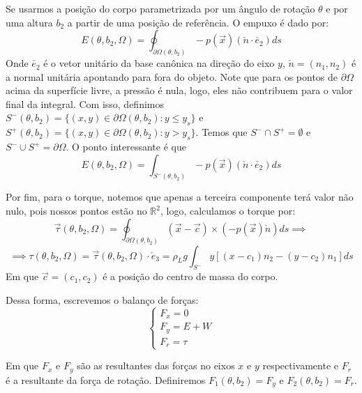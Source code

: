 \documentclass[
	12pt,				%
	oneside,			%
	a4paper,			%
	]{article}
\begin{document}
    Se usarmos a posição do corpo parametrizada por um ângulo de rotação $\theta$ e por uma altura $b_2$ a partir de uma posição de referência. O empuxo é dado por:
    \[
        E(\theta, b_2, \Omega) = \oint_{\partial \Omega (\theta, b_2)} -p(\vec{x})(\check{n} \cdot \check{e_2}) ds
    \]
    Onde $\check{e_2}$ é o vetor unitário da base canônica na direção do eixo $y$, $\check{n} = (n_1, n_2)$ é a normal unitária apontando para fora do objeto. Note que para os pontos de $\partial \Omega$ acima da superfície livre, a pressão é nula, logo, eles não contribuem para o valor final da integral. Com isso, definimos $S^-(\theta, b_2) = \{(x,y) \in \partial \Omega (\theta, b_2) : y \le y_s\}$ e $S^+(\theta, b_2) = \{(x,y) \in \partial \Omega (\theta, b_2) : y > y_s \}$. Temos que $S^- \cap S^+ = \emptyset$ e $S^- \cup S^+ = \partial \Omega$. O ponto interessante é que
    \begin{equation}
        E(\theta, b_2, \Omega) = \int_{S^- (\theta, b_2)} -p(\vec{x})(\check{n} \cdot \check{e_2}) ds
        \label{eq:empuxo}
    \end{equation}
    

    Por fim, para o torque, notemos que apenas a terceira componente terá valor não nulo, pois nossos pontos estão no $\mathbb{R}^2$, logo, calculamos o torque por:
    \[
        \vec{\tau}(\theta, b_2, \Omega) = \oint_{\partial \Omega (\theta, b_2)} (\vec{x} - \vec{c}) \times (-p(\vec{x}) \check{n}) ds \implies 
    \]
    \begin{equation}
        \implies \tau(\theta, b_2, \Omega) = \vec{\tau}(\theta, b_2, \Omega) \cdot \check{e}_3 = \rho_L g \int_{S^-} y[(x - c_1)n_2 - (y-c_2)n_1] ds
    \label{eq:torque}
    \end{equation}
    Em que $\vec{c} = (c_1, c_2)$ é a posição do centro de massa do corpo.


    Dessa forma, escrevemos o balanço de forças:
    \begin{equation}
        \label{eq:forças}
        \begin{cases}
            F_x = 0 \\
            F_y = E + W \\
            F_r = \tau
        \end{cases}
    \end{equation}

    Em que $F_x$ e $F_y$ são as resultantes das forças no eixos $x$ e $y$ respectivamente e $F_r$ é a resultante da força de rotação. Definiremos $F_1(\theta, b_2) = F_y$ e $F_2(\theta, b_2) = F_r$.
\end{document}

